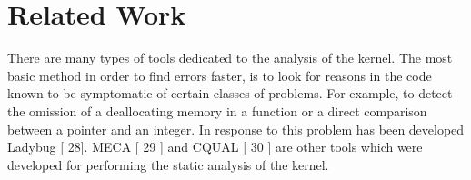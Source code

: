 \section{Related Work}
There are many types of tools dedicated to the analysis of the kernel. The most basic method in order to find errors faster, is to look for reasons in the code known to be symptomatic of certain classes of problems. For example, to detect the omission of a deallocating memory in a function or a direct comparison between a
pointer and an integer. In response to this problem has been
developed Ladybug [ 28]. MECA [ 29 ] and CQUAL [ 30 ] are other tools which were developed for performing the static analysis of the kernel.